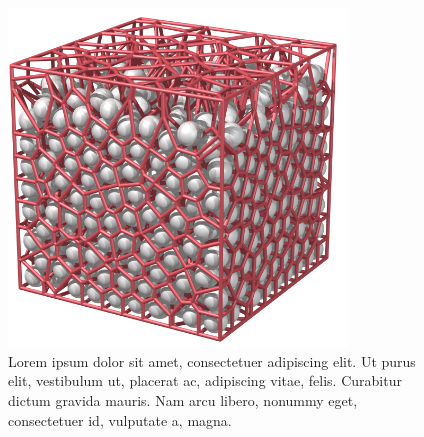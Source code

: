 \begin{figure}%
    \begin{minipage}[b]{0.4999\textwidth}%
        \captionsetup{width=.9\textwidth}%
        \centering%
        \caption{%
            Lorem ipsum dolor sit amet, consectetuer adipiscing elit. Ut purus elit, vestibulum ut, placerat ac, adipiscing vitae, felis. Curabitur dictum gravida mauris. Nam arcu libero, nonummy eget, consectetuer id, vulputate a, magna.%
            \label{fig:2d_voronoi_diagram}%
        }%
    \end{minipage}%
    \hfill%
    \begin{minipage}[b]{0.4999\textwidth}%
    \captionsetup{width=.9\textwidth}%
        \centering%
        \includegraphics[width=0.8\textwidth]{images/voronoi/import_AM2_A001.png}%
        \caption{%
            Lorem ipsum dolor sit amet, consectetuer adipiscing elit. Ut purus elit, vestibulum ut, placerat ac, adipiscing vitae, felis. Curabitur dictum gravida mauris. Nam arcu libero, nonummy eget, consectetuer id, vulputate a, magna.%
            \label{fig:a}%
        }%
    \end{minipage}%
\end{figure}%
